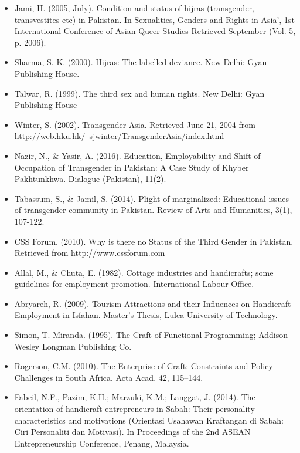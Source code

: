 \begin{itemize}
     

\item Jami, H. (2005, July). Condition and status of hijras (transgender, transvestites etc) in Pakistan. In Sexualities, Genders and Rights in Asia’, 1st International Conference of Asian Queer Studies Retrieved September (Vol. 5, p. 2006).

\item Sharma, S. K. (2000). Hijras: The labelled deviance. New Delhi: Gyan Publishing House.

\item Talwar, R. (1999). The third sex and human rights. New Delhi: Gyan Publishing House

\item Winter, S. (2002). Transgender Asia. Retrieved June 21, 2004 from http://web.hku.hk/~sjwinter/TransgenderAsia/index.html

\item Nazir, N., \& Yasir, A. (2016). Education, Employability and Shift of Occupation of Transgender in Pakistan: A Case Study of Khyber Pakhtunkhwa. Dialogue (Pakistan), 11(2).

\item Tabassum, S., \& Jamil, S. (2014). Plight of marginalized: Educational issues of transgender community in Pakistan. Review of Arts and Humanities, 3(1), 107-122. 

\item CSS Forum. (2010). Why is there no Status of the Third Gender in Pakistan. Retrieved from http://www.cssforum.com

\item Allal, M., \& Chuta, E. (1982). Cottage industries and handicrafts; some guidelines for employment promotion. International Labour Office.

\item Abryareh, R. (2009). Tourism Attractions and their Influences on Handicraft Employment in Isfahan. Master’s Thesis, Lulea University of Technology.

\item Simon, T. Miranda. (1995). The Craft of Functional Programming; Addison-Wesley Longman Publishing Co.

\item Rogerson, C.M. (2010). The Enterprise of Craft: Constraints and Policy Challenges in South Africa. Acta Acad. 42, 115–144.

\item Fabeil, N.F., Pazim, K.H.; Marzuki, K.M.; Langgat, J. (2014). The orientation of handicraft entrepreneurs in Sabah: Their personality characteristics and motivations (Orientasi Usahawan Kraftangan di Sabah: Ciri Personaliti dan Motivasi). In Proceedings of the 2nd ASEAN Entrepreneurship Conference, Penang, Malaysia.


\end{itemize}
